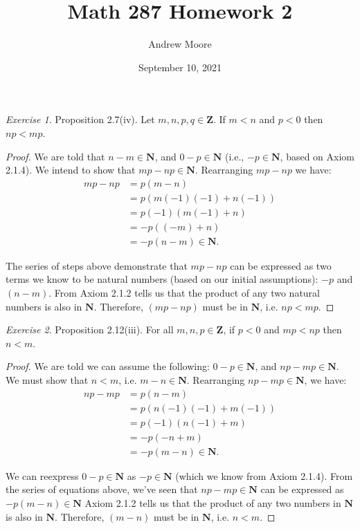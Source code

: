 \documentclass[12pt,oneside]{amsart}
\title{Math 287 Homework 2}
\author{Andrew Moore}
\date{September 10, 2021} %
\theoremstyle{remark}
\newtheorem{exer}{Exercise}
\newcommand{\bfN}{\mathbf{N}}
\newcommand{\bfZ}{\mathbf{Z}}
\begin{document}
\maketitle

\newpage
\begin{exer}
Proposition 2.7(iv). Let $m,n,p,q \in \bfZ$.
If $m < n$ and $p < 0$ then $np < mp$.
\end{exer}

\begin{proof}
We are told that $n - m \in \bfN$, and $0 - p \in \bfN$ (i.e., $-p \in \bfN$, based on Axiom 2.1.4). We intend to show that $mp - np \in \bfN$. Rearranging $mp - np$ we have:
\begin{align*}
mp - np &= p(m - n) \\
        &= p(m(-1)(-1) + n(-1)) \\
        &= p(-1)(m(-1) + n) \\
        &= -p((-m) + n) \\
        &= -p(n - m) \in \bfN.
\end{align*}

The series of steps above demonstrate that $mp - np$ can be expressed as two terms we know to be natural numbers (based on our initial assumptions): $-p$ and $(n - m)$. From Axiom 2.1.2 tells us that the product of any two natural numbers is also in $\bfN$. Therefore, $(mp - np)$ must be in $\bfN$, i.e. $np < mp$.
\end{proof}

\newpage
\begin{exer}
Proposition 2.12(iii). For all $m,n,p \in \bfZ$,
if $p < 0$ and $mp < np$ then $n < m$.
\end{exer}

\begin{proof}
We are told we can assume the following: $0 - p \in \bfN$, and $np - mp \in \bfN$. We must show that $n < m$, i.e. $m - n \in \bfN$. Rearranging $np - mp \in \bfN$, we have:
\begin{align*}
np - mp &= p(n - m) \\
        &= p(n(-1)(-1) + m(-1)) \\
        &= p(-1)(n(-1) + m) \\
        &= -p(-n + m) \\
        &= -p(m - n) \in \bfN.
\end{align*}

We can reexpress $0 - p \in \bfN$ as $-p \in \bfN$ (which we know from Axiom 2.1.4). From the series of equations above, we've seen that $np - mp \in \bfN$ can be expressed as $-p(m - n) \in \bfN$ Axiom 2.1.2 tells us that the product of any two numbers in $\bfN$ is also in $\bfN$. Therefore, $(m - n)$ must be in $\bfN$, i.e. $n < m$.

\end{proof}
\end{document}
